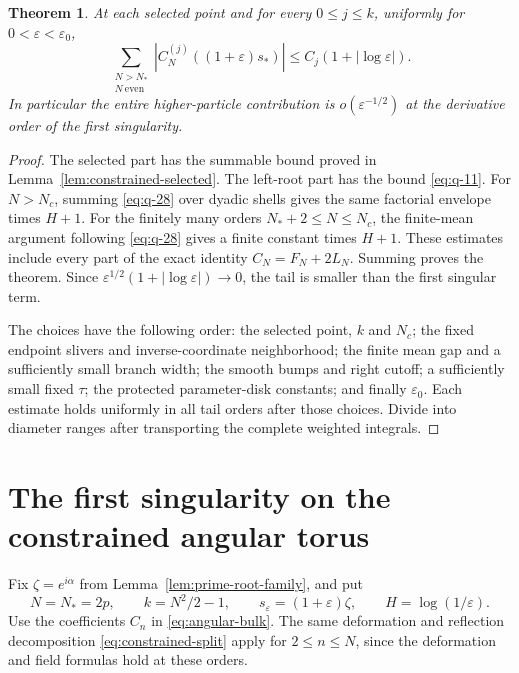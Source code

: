 \documentclass[11pt]{article}
\numberwithin{equation}{section}
\newtheorem{theorem}{Theorem}[section]
\theoremstyle{remark}\newtheorem{remark}[theorem]{Remark}
\begin{document}
\begin{theorem}\label{thm:constrained-tail}
At each selected point and for every $0\le j\le k$, uniformly
for $0<\varepsilon<\varepsilon_0$,
\begin{equation}\label{eq:logarithmic-absolute-tail}
 \sum_{\substack{N>N_*\\N\ \mathrm{even}}}
    |C_N^{(j)}((1+\varepsilon)s_*)|
       \le C_j(1+|\log\varepsilon|).
\end{equation}
In particular the entire higher-particle contribution is
$o(\varepsilon^{-1/2})$ at the derivative order of the first
singularity.
\end{theorem}
\begin{proof}
The selected part has the summable bound proved in
Lemma~\ref{lem:constrained-selected}. The left-root part has
the bound \eqref{eq:q-11}. For $N>N_c$, summing
\eqref{eq:q-28} over dyadic shells gives the same factorial
envelope times $H+1$. For the finitely many orders
$N_*+2\le N\le N_c$, the finite-mean argument following
\eqref{eq:q-28} gives a finite constant times $H+1$.
These estimates include every part of the exact identity
$C_N=F_N+2L_N$. Summing proves the theorem.
Since $\varepsilon^{1/2}(1+|\log\varepsilon|)\to0$, the tail is
smaller than the first singular term.

The choices have the following order: the selected point,
$k$ and $N_c$; the fixed endpoint slivers and inverse-coordinate
neighborhood; the finite mean gap and a sufficiently small
branch width; the smooth bumps and right cutoff; a sufficiently
small fixed $\tau$; the protected parameter-disk constants;
and finally $\varepsilon_0$. Each estimate holds uniformly in
all tail orders after those choices. Divide into diameter ranges
after transporting the complete weighted integrals.
\end{proof}

\section{The first singularity on the constrained angular torus}
\label{sec:first-single}

Fix $\zeta=e^{i\alpha}$ from Lemma~\ref{lem:prime-root-family}, and put
\[
 N=N_*=2p,\qquad k=N^2/2-1,\qquad
 s_\varepsilon=(1+\varepsilon)\zeta,
 \qquad H=\log(1/\varepsilon).
\]
Use the coefficients $C_n$ in \eqref{eq:angular-bulk}.
The same deformation and reflection decomposition
\eqref{eq:constrained-split} apply for $2\le n\le N$, since
the deformation and field formulas hold at these orders.
\end{document}
